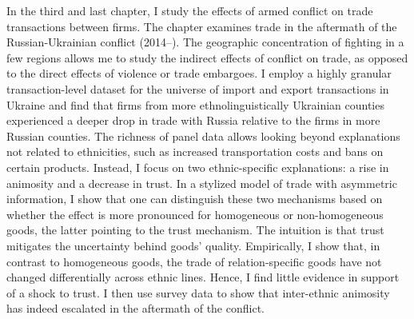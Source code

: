 {In the third and last chapter, I study the effects of armed conflict on trade transactions between firms. The chapter examines trade in the aftermath of the Russian-Ukrainian conflict (2014–). The geographic concentration of fighting in a few regions allows me to study the indirect effects of conflict on trade, as opposed to the direct effects of violence or trade embargoes. I employ a highly granular transaction-level dataset for the universe of import and export transactions in Ukraine and find that firms from more ethnolinguistically Ukrainian counties experienced a deeper drop in trade with Russia relative to the firms in more Russian counties. The richness of panel data allows looking beyond explanations not related to ethnicities, such as increased transportation costs and bans on certain products. Instead, I focus on two ethnic-specific explanations: a rise in animosity and a decrease in trust. In a stylized model of trade with asymmetric information, I show that one can distinguish these two mechanisms based on whether the effect is more pronounced for homogeneous or non-homogeneous goods, the latter pointing to the trust mechanism. The intuition is that trust mitigates the uncertainty behind goods' quality. Empirically, I show that, in contrast to homogeneous goods, the trade of relation-specific goods have not changed differentially across ethnic lines. Hence, I find little evidence in support of a shock to trust. I then use survey data to show that inter-ethnic animosity has indeed escalated in the aftermath of the conflict. 

}





\dedication     {To Nana, my first chearleader. To everyone who took a chance on me.}


